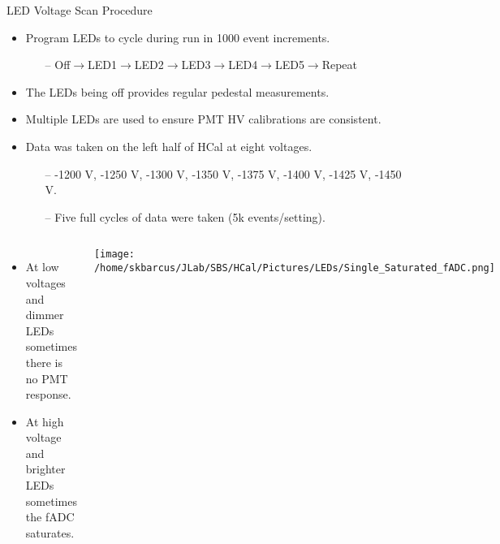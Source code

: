 \documentclass[10pt]{beamer}
\begin{document}
\begin{frame}{LED Voltage Scan Procedure}

	\begin{itemize}
		\item Program LEDs to cycle during run in 1000 event increments.
			\begin{itemize}
				\item[--] Off$\rightarrow$LED1$\rightarrow$LED2$\rightarrow$LED3$\rightarrow$LED4$\rightarrow$LED5$\rightarrow$Repeat
			\end{itemize}
		\item The LEDs being off provides regular pedestal measurements.
		\item Multiple LEDs are used to ensure PMT HV calibrations are consistent.
		\item Data was taken on the left half of HCal at eight voltages.
			\begin{itemize}
				\item[--] -1200 V, -1250 V, -1300 V, -1350 V, -1375 V, -1400 V, -1425 V, -1450 V.
				\item[--] Five full cycles of data were taken (5k events/setting).
			\end{itemize}
	\end{itemize}
	
	\begin{columns}[T,onlytextwidth]
	\begin{itemize}
		\item At low voltages and dimmer LEDs sometimes there is no PMT response.
		\item At high voltage and brighter LEDs sometimes the fADC saturates.
	\end{itemize}
	
	\vspace{-4mm}
	\begin{center}
		\texttt{[image: /home/skbarcus/JLab/SBS/HCal/Pictures/LEDs/Single\_Saturated\_fADC.png]}
  	\end{center}
  	
	\end{columns}

\end{frame}
\end{document}

